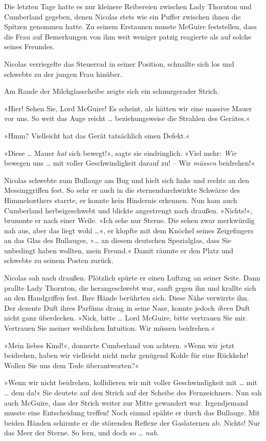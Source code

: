 Die letzten Tage hatte es nur kleinere Reibereien zwischen Lady
Thornton und Cumberland gegeben, denen Nicolas stets wie ein Puffer
zwischen ihnen die Spitzen genommen hatte. Zu seinem Erstaunen
musste McGuire feststellen, dass die Frau auf Bemerkungen von ihm
weit weniger patzig reagierte als auf solche seines Freundes.

Nicolas verriegelte das Steuerrad in seiner Position, schnallte
sich los und schwebte zu der jungen Frau hinüber.

Am Rande der Milchglasscheibe zeigte sich ein schnurgerader
Strich.

»Hier! Sehen Sie, Lord McGuire! Es scheint, als hätten wir eine
massive Mauer vor uns. So weit das Auge reicht … beziehungsweise
die Strahlen des Gerätes.«

»Hmm? Vielleicht hat das Gerät tatsächlich einen Defekt.«

»Diese … Mauer \emph{hat} sich bewegt!«, sagte sie eindringlich.
»Viel mehr: \emph{Wir} bewegen uns … mit voller Geschwindigkeit
darauf zu! – Wir \emph{müssen} beidrehen!«

Nicolas schwebte zum Bullauge am Bug und hielt sich links und
rechts an den Messinggriffen fest. So sehr er auch in die
sternendurchwirkte Schwärze des Himmelsæthers starrte, er konnte
kein Hindernis erkennen. Nun kam auch Cumberland herbeigeschwebt
und blickte angestrengt nach draußen. »Nichts!«, brummte er nach
einer Weile. »Ich sehe nur Sterne. Die sehen zwar merkwürdig nah
aus, aber das liegt wohl …«, er klopfte mit dem Knöchel seines
Zeigefingers an das Glas des Bullauges, »… an diesem deutschen
Spezialglas, dass Sie unbedingt haben wollten, mein Freund.« Damit
räumte er den Platz und schwebte zu seinem Posten zurück.

Nicolas sah nach draußen. Plötzlich spürte er einen Luftzug an
seiner Seite. Dann prallte Lady Thornton, die herangeschwebt war,
sanft gegen ihn und krallte sich an den Handgriffen fest. Ihre
Hände berührten sich. Diese Nähe verwirrte ihn. Der dezente Duft
ihres Parfüms drang in seine Nase, konnte jedoch \emph{ihren} Duft
nicht ganz überdecken. »Nick, bitte … Lord McGuire, bitte vertrauen
Sie mir. Vertrauen Sie meiner weiblichen Intuition. Wir müssen
beidrehen.«

»Mein liebes Kind!«, donnerte Cumberland von achtern. »Wenn wir
jetzt beidrehen, haben wir vielleicht nicht mehr genügend Kohle für
eine Rückkehr! Wollen Sie uns dem Tode überantworten?«

»Wenn wir nicht beidrehen, kollidieren wir mit voller
Geschwindigkeit mit … mit … dem da!« Sie deutete auf den Strich auf
der Scheibe des Fernzeichners. Nun sah auch McGuire, dass der
Strich weiter zur Mitte gewandert war. Irgendjemand musste eine
Entscheidung treffen! Noch einmal spähte er durch das Bullauge. Mit
beiden Händen schirmte er die störenden Reflexe der Gaslaternen ab.
Nichts! Nur das Meer der Sterne. So fern, und doch so …
\emph{nah}.

